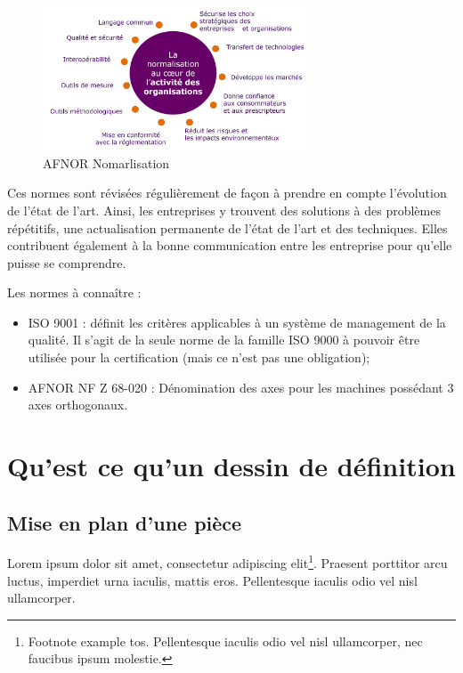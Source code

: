 \documentclass[
	11pt, %
	fleqn, %
	a4paper, %
]{LegrandOrangeBook}
\begin{document}
\begin{figure}[H] %
	\centering %
	\includegraphics[width=0.7\textwidth]{normes.PNG} %
	\caption{AFNOR Nomarlisation}
	\label{fig:placeholder} %
\end{figure}

Ces normes sont révisées régulièrement de façon à prendre en compte l’évolution de l’état de l’art. Ainsi, les entreprises y trouvent des solutions à des problèmes répétitifs, une actualisation permanente de l'état de l'art et des techniques. Elles contribuent également à la bonne communication entre les entreprise pour qu'elle puisse se comprendre.

Les normes à connaître :
\begin{itemize}
    \item ISO 9001 : définit les critères applicables à un système de management de la qualité. Il s’agit de la seule norme de la famille ISO 9000 à pouvoir être utilisée pour la certification (mais ce n’est pas une obligation);
    \item AFNOR NF Z 68-020 : Dénomination des axes pour les machines possédant 3 axes orthogonaux.
\end{itemize}

\section{Qu'est ce qu'un dessin de définition}
\subsection{Mise en plan d'une pièce}
Lorem ipsum dolor sit amet, consectetur adipiscing elit\footnote{Footnote example tos. Pellentesque iaculis odio vel nisl ullamcorper, nec faucibus ipsum molestie.}. Praesent porttitor arcu luctus, imperdiet urna iaculis, mattis eros. Pellentesque iaculis odio vel nisl ullamcorper.
\end{document}
